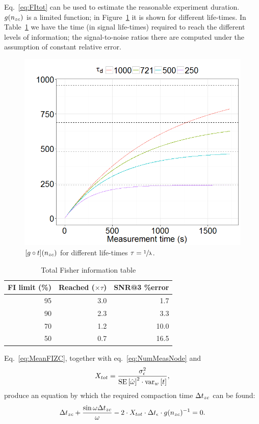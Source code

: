 \documentclass{article}
\newcommand{\dt}{\Delta t}
\newcommand{\dtm}{\dt_{\meas}}
\begin{document}
Eq.~\eqref{eq:FItot} can be used to estimate the reasonable experiment duration. $g(n_{zc})$ is a limited function; in Figure~\ref{fig:GofT} it is shown for different life-times. In Table~\ref{tbl:FItot} we have the time (in signal life-times) required to reach the different levels of information; the signal-to-noise ratios there are computed under the assumption of constant relative error.
\begin{figure}[h]
	\centering
	\includegraphics[scale=.5]{../MEPhI/img/XtotOnTime}
	\caption{$[g\circ t](n_{zc})$ for different life-times $\tau = \sfrac1\lambda$.\label{fig:GofT}}
\end{figure}
\begin{table}[h]
	\centering
	\caption{Total Fisher information table\label{tbl:FItot}}
	\begin{tabular}{rrr}
		\hline
		FI limit (\%) & Reached ($\times\tau$) & SNR@3 \%error \\ \hline
		95 &                    3.0 &            1.7 \\
		90 &                    2.3 &            3.3 \\
		70 &                    1.2 &           10.0 \\
		50 &                    0.7 &           16.5 \\
		\hline
	\end{tabular}
\end{table}

Eq.~\eqref{eq:MeanFIZC}, together with eq.~\eqref{eq:NumMeasNode} and
\[
	\stat* = \stat,
\]
produce an equation by which the required compaction time $\dtnd$ can be found:
\begin{equation}
	\dtnd + \frac{\sin\omega\dtnd}{\omega} - 2\cdot \stat* \cdot\dtm \cdot g(\Nnd)^{-1}= 0.
\end{equation}
\end{document}
